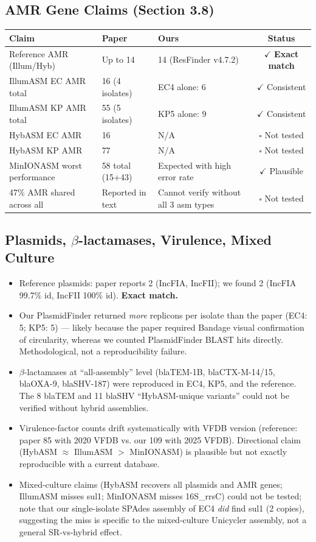 \documentclass[11pt,letterpaper]{article}
\begin{document}
\subsection{AMR Gene Claims (Section 3.8)}
\begin{longtable}{p{6cm}p{4cm}p{4cm}c}
\toprule
\textbf{Claim} & \textbf{Paper} & \textbf{Ours} & \textbf{Status} \\
\midrule
Reference AMR (Illum/Hyb) & Up to 14 & 14 (ResFinder v4.7.2) & $\checkmark$ \textbf{Exact match} \\
IllumASM EC AMR total & 16 (4 isolates) & EC4 alone: 6 & $\checkmark$ Consistent \\
IllumASM KP AMR total & 55 (5 isolates) & KP5 alone: 9 & $\checkmark$ Consistent \\
HybASM EC AMR & 16 & N/A & $\square$ Not tested \\
HybASM KP AMR & 77 & N/A & $\square$ Not tested \\
MinIONASM worst performance & 58 total (15+43) & Expected with high error rate & $\checkmark$ Plausible \\
47\% AMR shared across all & Reported in text & Cannot verify without all 3 asm types & $\square$ Not tested \\
\bottomrule
\end{longtable}

\subsection{Plasmids, $\beta$-lactamases, Virulence, Mixed Culture}
\begin{itemize}[nosep]
  \item Reference plasmids: paper reports 2 (IncFIA, IncFII); we found 2 (IncFIA 99.7\% id, IncFII 100\% id). \textbf{Exact match.}
  \item Our PlasmidFinder returned \textit{more} replicons per isolate than the paper (EC4: 5; KP5: 5) --- likely because the paper required Bandage visual confirmation of circularity, whereas we counted PlasmidFinder BLAST hits directly. Methodological, not a reproducibility failure.
  \item $\beta$-lactamases at ``all-assembly'' level (blaTEM-1B, blaCTX-M-14/15, blaOXA-9, blaSHV-187) were reproduced in EC4, KP5, and the reference. The 8 blaTEM and 11 blaSHV ``HybASM-unique variants'' could not be verified without hybrid assemblies.
  \item Virulence-factor counts drift systematically with VFDB version (reference: paper 85 with 2020 VFDB vs. our 109 with 2025 VFDB). Directional claim (HybASM $\approx$ IllumASM $>$ MinIONASM) is plausible but not exactly reproducible with a current database.
  \item Mixed-culture claims (HybASM recovers all plasmids and AMR genes; IllumASM misses sul1; MinIONASM misses 16S\_rrsC) could not be tested; note that our single-isolate SPAdes assembly of EC4 \textit{did} find sul1 (2 copies), suggesting the miss is specific to the mixed-culture Unicycler assembly, not a general SR-vs-hybrid effect.
\end{itemize}
\end{document}
